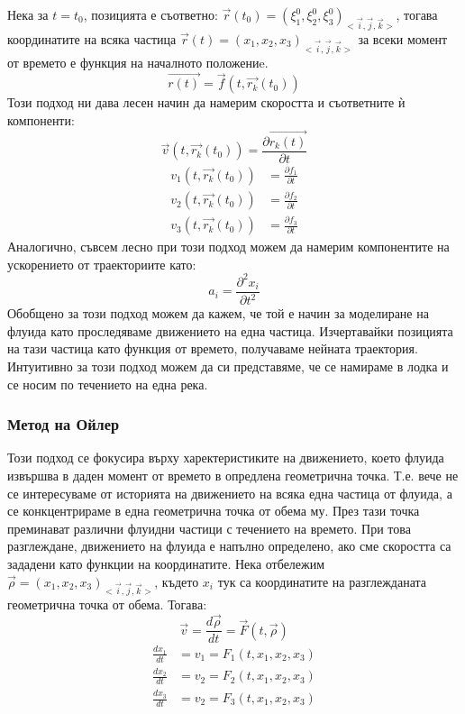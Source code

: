 Нека за $t= t_0$, позицията е съответно: $\vec{r}(t_0) = (\xi^{0}_1,\xi^{0}_2,\xi^{0}_3)_{<\vec{i}, \vec{j}, \vec{k}>}$, тогава координатите на всяка частица $\vec{r}(t) = (x_1,x_2,x_3)_{<\vec{i}, \vec{j}, \vec{k}>}$ за
всеки момент от времето е функция на началното положениe.
\begin{equation}
	\vec{r(t)} = \vec{f}(t, \vec{r_k}(t_0))
\end{equation}
Този подход ни дава лесен начин да намерим скоростта и съответните ѝ компоненти:
\begin{equation}
	\vec{v}(t, \vec{r_k}(t_0)) =  \frac{\partial \vec{r_k(t)}}{\partial t}
	\label{eq:lagrange}
\end{equation}
\begin{align*}
	v_1 (t, \vec{r_k}(t_0)) & =  \frac{\partial f_1}{\partial t} \\
	v_2 (t, \vec{r_k}(t_0)) & =  \frac{\partial f_2}{\partial t} \\
	v_3 (t, \vec{r_k}(t_0)) & =  \frac{\partial f_3}{\partial t}
	\label{eq:lagrange_velocity}
\end{align*}
Аналогично, съвсем лесно при този подход можем да намерим компонентите на ускорението от траекториите като:
\begin{equation}
	a_{i} = \frac{\partial^2 x_i}{\partial t^2}
\end{equation}
Обобщено за този подход можем да кажем, че той е начин за моделиране на флуида като проследяваме движението на една частица. Изчертавайки позицията на тази частица като функция от времето, получаваме нейната траектория. Интуитивно за този подход
можем да си представяме, че се намираме в лодка и се носим по течението на една река.

\subsubsection{Метод на Ойлер}
Този подход се фокусира върху харектеристиките на движението, което флуида извършва в даден момент от времето в опредлена геометрична точка. Т.е. вече не се интересуваме от историята на движението на всяка една частица от флуида, а се конкцентрираме
в една геометрична точка от обема му. През тази точка преминават различни флуидни частици с течението на времето. При това разглеждане, движението на флуида е напълно определено, ако сме скоростта са зададени като функции на координатите. Нека отбележим $\vec{\rho} = (x_1,x_2,x_3)_{<\vec{i}, \vec{j}, \vec{k}>}$,
където $x_i$ тук са координатите на разглежданата геометрична точка от обема. Тогава:
\begin{equation}
	\vec{v} = \frac{d \vec{\rho}}{d t} = \vec{F}(t, \vec{\rho})
	\label{eq:euler}
\end{equation}
\begin{align*}
	\frac{d x_1}{d t} & = v_1 = F_1(t, x_1, x_2, x_3) \\
	\frac{d x_2}{d t} & = v_2 = F_2(t, x_1, x_2, x_3) \\
	\frac{d x_3}{d t} & = v_2 = F_3(t, x_1, x_2, x_3)
\end{align*}

